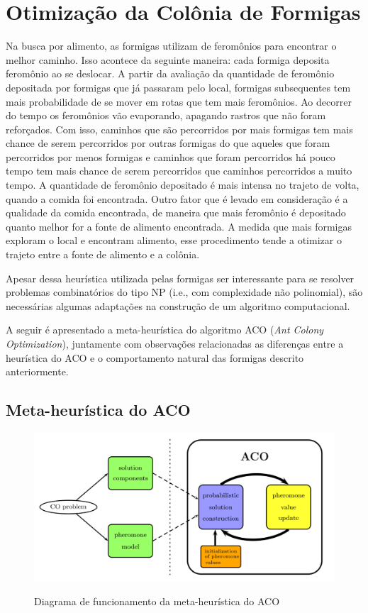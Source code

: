 \section{Otimização da Colônia de Formigas}

Na busca por alimento, as formigas utilizam de feromônios para encontrar o melhor caminho.
Isso acontece da seguinte maneira: cada formiga deposita feromônio ao se deslocar. A partir
da avaliação da quantidade de feromônio depositada por formigas que já passaram pelo local,
formigas subsequentes tem mais probabilidade de se mover em rotas que tem mais feromônios. Ao
decorrer do tempo os feromônios vão evaporando, apagando rastros que não foram reforçados. 
Com isso, caminhos que são percorridos por mais formigas tem mais chance de serem 
percorridos por outras formigas do que aqueles que foram percorridos por menos formigas e 
caminhos que foram percorridos há pouco tempo tem mais chance de serem percorridos que caminhos
percorridos a muito tempo. A quantidade de feromônio depositado é mais intensa no trajeto de volta,
quando a comida foi encontrada. Outro fator que é levado em consideração é a qualidade da comida
encontrada, de maneira que mais feromônio é depositado quanto melhor for a fonte de alimento encontrada.
A medida que mais formigas exploram o local e encontram alimento, esse procedimento tende a otimizar o
trajeto entre a fonte de alimento e a colônia.

Apesar dessa heurística utilizada pelas formigas ser interessante para se resolver problemas combinatórios 
do tipo NP (i.e., com complexidade não polinomial), são necessárias algumas adaptações na construção
de um algoritmo computacional.

A seguir é apresentado a meta-heurística do algoritmo ACO (\textit{Ant Colony Optimization}),
juntamente com observações relacionadas as diferenças entre a heurística do ACO e o
comportamento natural das formigas descrito anteriormente.

\subsection{Meta-heurística do ACO}

\begin{figure}[ht]
  \includegraphics[width = 0.9 \linewidth]{imgs/meta_heuristica_aco}
  \label{diagrama_metaheuristica_aco}
  \caption{Diagrama de funcionamento da meta-heurística do ACO \cite{blum2005aco}}
\end{figure}

